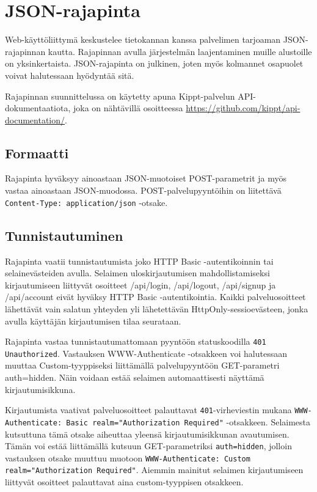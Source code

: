 \documentclass[a4paper,parskip=half]{scrartcl}
\begin{document}
\section{JSON-rajapinta}

Web-käyttöliittymä keskustelee tietokannan kanssa palvelimen tarjoaman
JSON-rajapinnan kautta. Rajapinnan avulla järjestelmän laajentaminen muille
alustoille on yksinkertaista. JSON-rajapinta on julkinen, joten myös kolmannet
osapuolet voivat halutessaan hyödyntää sitä.

Rajapinnan suunnittelussa on käytetty apuna Kippt-palvelun API-dokumentaatiota,
joka on nähtävillä osoitteessa
\url{https://github.com/kippt/api-documentation/}.

\subsection{Formaatti}

Rajapinta hyväksyy ainoastaan JSON-muotoiset POST-parametrit ja myös vastaa
ainoastaan JSON-muodossa. POST-palvelupyyntöihin on liitettävä
\texttt{Content-Type: application/json} -otsake.

\subsection{Tunnistautuminen}

Rajapinta vaatii tunnistautumista joko HTTP Basic -autentikoinnin tai
selainevästeiden avulla. Selaimen uloskirjautumisen mahdollistamiseksi
kirjautumiseen liittyvät osoitteet /api/login, /api/logout, /api/signup ja
/api/account eivät hyväksy HTTP Basic -autentikointia. Kaikki palveluosoitteet
lähettävät vain salatun yhteyden yli lähetettävän HttpOnly-sessioevästeen,
jonka avulla käyttäjän kirjautumisen tilaa seurataan.

Rajapinta vastaa tunnistautumattomaan pyyntöön statuskoodilla \texttt{401
Unauthorized}. Vastauksen WWW-Authenticate -otsakkeen voi halutessaan muuttaa
Custom-tyyppiseksi liittämällä palvelupyyntöön GET-parametri auth=hidden. Näin
voidaan estää selaimen automaattisesti näyttämä kirjautumisikkuna.

Kirjautumista vaativat palveluosoitteet palauttavat \texttt{401}-virheviestin
mukana \texttt{WWW-Authenticate: Basic realm="Authorization Required"}
-otsakkeen. Selaimesta kutsuttuna tämä otsake aiheuttaa yleensä
kirjautumisikkunan avautumisen. Tämän voi estää liittämällä kutsuun
GET-parametriksi \texttt{auth=hidden}, jolloin vastauksen otsake muuttuu
muotoon \texttt{WWW-Authenticate: Custom realm="Authorization Required"}.
Aiemmin mainitut selaimen kirjautumiseen liittyvät osoitteet palauttavat aina
custom-tyyppisen otsakkeen.
\end{document}
